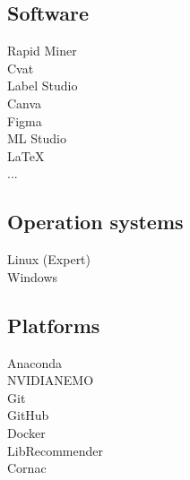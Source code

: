 \documentclass[a4paper]{deedy-resume} %
\begin{document}
\begin{minipage}[t]{0.33\textwidth}
\subsection{Software}
Rapid Miner\\
Cvat \\
Label Studio\\
Canva \\
Figma \\
ML Studio\\
\LaTeX \\
...\\

\subsection{Operation systems}
Linux (Expert)\\
Windows\\

\sectionspace %


\subsection{Platforms}
Anaconda \\
NVIDIA\texttrademark NEMO \\
Git\\
GitHub \\
Docker \\
LibRecommender\\
Cornac\\

\sectionspace %


\end{minipage} %
\hfill
%
%
\end{document}
